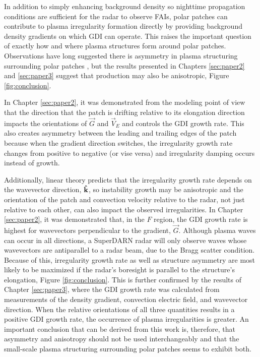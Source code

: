 In addition to simply enhancing background density so nighttime propagation conditions are sufficient for the radar to observe FAIs, polar patches can contribute to plasma irregularity formation directly by providing background density gradients on which GDI can operate.  This raises the important question of exactly how and where plasma structures form around polar patches.  Observations have long suggested there is asymmetry in plasma structuring surrounding polar patches \citep{Weber1984,Milan2002b,Koustov2012}, but the results presented in Chapters \ref{sec:paper2} and \ref{sec:paper3} suggest that production may also be anisotropic, Figure \ref{fig:conclusion}.  

In Chapter \ref{sec:paper2}, it was demonstrated from the modeling point of view that the direction that the patch is drifting relative to its elongation direction impacts the orientations of \(\vec{G}\) and \(\vec{V}_E\) and controls the GDI growth rate.  This also creates asymmetry between the leading and trailing edges of the patch because when the gradient direction switches, the irregularity growth rate changes from positive to negative (or vise versa) and irregularity damping occurs instead of growth.  

Additionally, linear theory predicts that the irregularity growth rate depends on the wavevector direction, \(\mathbf{\hat{k}}\), so instability growth may be anisotropic and the orientation of the patch and convection velocity relative to the radar, not just relative to each other, can also impact the observed irregularities.  In Chapter \ref{sec:paper2}, it was demonstrated that, in the \(F\) region, the GDI growth rate is highest for wavevectors perpendicular to the gradient, \(\vec{G}\).  Although plasma waves can occur in all directions, a SuperDARN radar will only observe waves whose wavevectors are antiparallel to a radar beam, due to the Bragg scatter condition.  Because of this, irregularity growth rate as well as structure asymmetry are most likely to be maximized if the radar's boresight is parallel to the structure's elongation, Figure \ref{fig:conclusion}.  This is further confirmed by the results of Chapter \ref{sec:paper3}, where the GDI growth rate was calculated from measurements of the density gradient, convection electric field, and wavevector direction.  When the relative orientations of all three quantities results in a positive GDI growth rate, the occurrence of plasma irregularities is greater.  An important conclusion that can be derived from this work is, therefore, that asymmetry and anisotropy should not be used interchangeably and that the small-scale plasma structuring surrounding polar patches seems to exhibit both.

